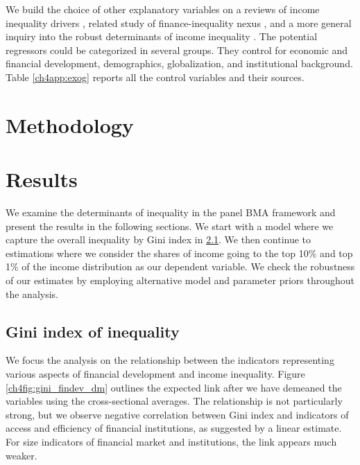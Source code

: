 \begin{refsection}
We build the choice of other explanatory variables on a reviews of income inequality drivers \parencite{roineetal2009,nolan2019drivers}, related study of finance-inequality nexus \parencite{de2017finance}, and a more general inquiry into the robust determinants of income inequality \parencite{furceri2019robust}. The potential regressors could be categorized in several groups. They control for economic and financial development, demographics, globalization, and institutional background. Table \ref{ch4app:exog} reports all the control variables and their sources. 


%
%
\section{Methodology}
\label{ch4sec:methodology}

\section{Results}
\label{ch4sec:results}
We examine the determinants of inequality in the panel \ac{BMA} framework and present the results in the following sections. We start with a model where we capture the overall inequality by Gini index in \ref{ch4subsec:gini}. We then continue to estimations where we consider the shares of income going to the top 10\% and top 1\% of the income distribution as our dependent variable. We check the robustness of our estimates by employing alternative model and parameter priors throughout the analysis.

\subsection{Gini index of inequality}\label{ch4subsec:gini}
We focus the analysis on the relationship between the indicators representing various aspects of financial development and income inequality. Figure \ref{ch4fig:gini_findev_dm} outlines the expected link after we have demeaned the variables using the cross-sectional averages. The relationship is not particularly strong, but we observe negative correlation between Gini index and indicators of access and efficiency of financial institutions, as suggested by a linear estimate. For size indicators of financial market and institutions, the link appears much weaker. 


\end{refsection}
